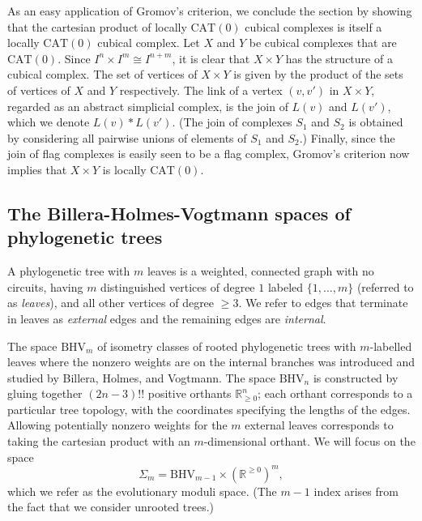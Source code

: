 \documentclass[a4paper,11pt]{article}
\newcommand{\CAT}{\textrm{CAT}}
\newcommand{\BHV}{\textrm{BHV}}
\begin{document}
As an easy application of Gromov's criterion, we conclude the section by showing that the cartesian product of locally $\CAT(0)$ cubical complexes is itself a locally $\CAT(0)$ cubical complex.
Let $X$ and $Y$ be cubical complexes that are $\CAT(0)$.
Since $I^n \times I^m \cong I^{n+m}$, it is clear that $X \times Y$ has the structure of a cubical complex.
The set of vertices of $X \times Y$ is given by the product of the sets of vertices of $X$ and $Y$ respectively.
The link of a vertex $(v,v')$ in $X \times Y$, regarded as an abstract simplicial complex, is the join of $L(v)$ and $L(v')$, which we denote $L(v) \ast L(v')$.
(The join of complexes $S_1$ and $S_2$ is obtained by considering all pairwise unions of elements of $S_1$ and $S_2$.)
Finally, since the join of flag complexes is easily seen to be a flag complex, Gromov's criterion now implies that $X \times Y$ is locally $\CAT(0)$.

\subsection{The Billera-Holmes-Vogtmann spaces of phylogenetic trees}

A phylogenetic tree with $m$ leaves is a weighted, connected graph with no circuits, having $m$ distinguished vertices of degree $1$ labeled $\{1, \ldots, m\}$ (referred to as {\em leaves}), and all other vertices of degree $\geq 3$.
We refer to edges that terminate in leaves as {\em external} edges and the remaining edges are {\em internal}.

The space $\BHV_m$ of isometry classes of rooted phylogenetic trees with $m$-labelled leaves where the nonzero weights are on the internal branches was introduced and studied by Billera, Holmes, and Vogtmann.
The space $\BHV_n$ is constructed by gluing together $(2n-3)!!$ positive orthants $\mathbb{R}^n_{\geq 0}$; each orthant corresponds to a particular tree topology, with the coordinates specifying the lengths of the edges.
Allowing potentially nonzero weights for the $m$ external leaves corresponds to taking the cartesian product with an $m$-dimensional orthant.
We will focus on the space 
\[\Sigma_m = \BHV_{m-1} \times (\mathbb{R}^{\geq 0})^{m},\]
which we refer as the evolutionary moduli space.
(The $m-1$ index arises from the fact that we consider unrooted trees.)
\end{document}
